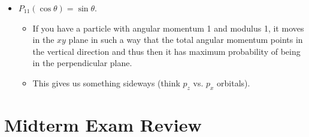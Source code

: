 \documentclass[../notes.tex]{subfiles}
\begin{document}
\begin{itemize}
\begin{itemize}
        \item $P_{11}(\cos\theta)=\sin\theta$.
        \begin{itemize}
            \item If you have a particle with angular momentum 1 and modulus 1, it moves in the $xy$ plane in such a way that the total angular momentum points in the vertical direction and thus then it has maximum probability of being in the perpendicular plane.
            \item This gives us something sideways (think $p_z$ vs. $p_x$ orbitals).
        \end{itemize}
    \end{itemize}
\end{itemize}



\section{Midterm Exam Review}
\end{document}
